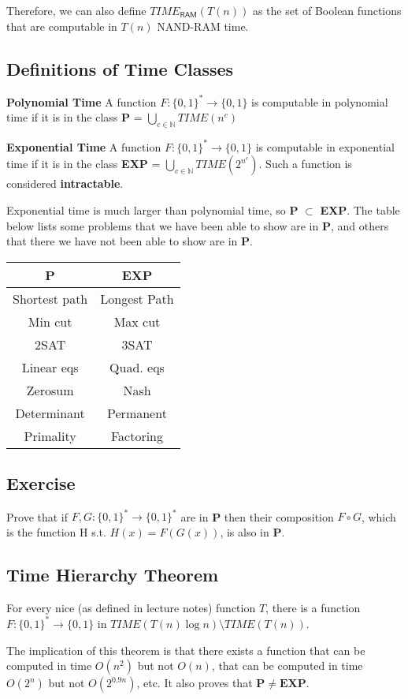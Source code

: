 \documentclass[11pt]{article}
\theoremstyle{definition}
\theoremstyle{remark}
\begin{document}
Therefore, we can also define $TIME_\mathsf{RAM} (T(n))$ as the set of Boolean functions that are computable in $T(n)$ NAND-RAM time.



\subsection{Definitions of Time Classes}
\textbf{Polynomial Time} A function $F:\{0,1\}^* \rightarrow \{0,1 \}$ is computable in polynomial time if it is in the class \textbf{P} = $\bigcup_{c \in \mathbb{N}} TIME(n^c)$

\textbf{Exponential Time} A function $F:\{0,1\}^* \rightarrow \{0,1 \}$ is computable in exponential time if it is in the class \textbf{EXP} = $\bigcup_{c \in \mathbb{N}} TIME(2^{n^c})$. Such a function is considered \textbf{intractable}.

Exponential time is much larger than polynomial time, so \textbf{P} $\subset$ \textbf{EXP}. The table below lists some problems that we have been able to show are in \textbf{P}, and others that there we have not been able to show are in \textbf{P}. 

\begin{center}
\begin{tabular}{ c|c} 
P & EXP \\
 \hline
Shortest path &	Longest Path \\
Min cut&		Max cut \\
2SAT&		3SAT \\
Linear eqs	 &	Quad. eqs \\
Zerosum	&	 Nash \\
Determinant	&	Permanent\\ 
Primality	&	Factoring \\ 
\end{tabular}
\end{center}

\subsection{Exercise}
Prove that if $F, G:\{0,1\}^* \rightarrow \{0,1 \}^*$ are in \textbf{P} then their composition $F \circ G$, which is the function H s.t. $H(x)=F(G(x))$, is also in \textbf{P}.



\subsection{Time Hierarchy Theorem} 

For every nice (as defined in lecture notes) function $T$, there is a function $F:\{0,1\}^* \rightarrow \{0,1\}$ in $TIME(T(n) \log n) \setminus TIME(T(n))$.

The implication of this theorem is that there exists a function that can be computed in time $O(n^2)$ but not $O(n)$, that can be computed in time $O(2^n)$ but not $O(2^{0.9n})$, etc. It also proves that $\mathbf{P} \neq \mathbf{EXP}$. 
\end{document}
